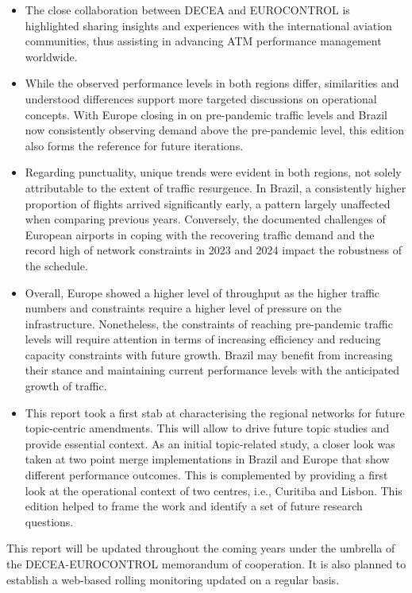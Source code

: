 \documentclass[
  a4paper,
  DIV=11,
  numbers=noendperiod]{scrreport}
\providecommand{\tightlist}{%
  \setlength{\itemsep}{0pt}\setlength{\parskip}{0pt}}\usepackage{longtable,booktabs,array}
\begin{document}
\begin{itemize}
\tightlist
\item
  The close collaboration between DECEA and EUROCONTROL is highlighted
  sharing insights and experiences with the international aviation
  communities, thus assisting in advancing ATM performance management
  worldwide.
\item
  While the observed performance levels in both regions differ,
  similarities and understood differences support more targeted
  discussions on operational concepts. With Europe closing in on
  pre-pandemic traffic levels and Brazil now consistently observing
  demand above the pre-pandemic level, this edition also forms the
  reference for future iterations.
\item
  Regarding punctuality, unique trends were evident in both regions, not
  solely attributable to the extent of traffic resurgence. In Brazil, a
  consistently higher proportion of flights arrived significantly early,
  a pattern largely unaffected when comparing previous years.
  Conversely, the documented challenges of European airports in coping
  with the recovering traffic demand and the record high of network
  constraints in 2023 and 2024 impact the robustness of the schedule.
\item
  Overall, Europe showed a higher level of throughput as the higher
  traffic numbers and constraints require a higher level of pressure on
  the infrastructure. Nonetheless, the constraints of reaching
  pre-pandemic traffic levels will require attention in terms of
  increasing efficiency and reducing capacity constraints with future
  growth. Brazil may benefit from increasing their stance and
  maintaining current performance levels with the anticipated growth of
  traffic.
\item
  This report took a first stab at characterising the regional networks
  for future topic-centric amendments. This will allow to drive future
  topic studies and provide essential context. As an initial
  topic-related study, a closer look was taken at two point merge
  implementations in Brazil and Europe that show different performance
  outcomes. This is complemented by providing a first look at the
  operational context of two centres, i.e., Curitiba and Lisbon. This
  edition helped to frame the work and identify a set of future research
  questions.
\end{itemize}

This report will be updated throughout the coming years under the
umbrella of the DECEA-EUROCONTROL memorandum of cooperation. It is also
planned to establish a web-based rolling monitoring updated on a regular
basis.
\end{document}
